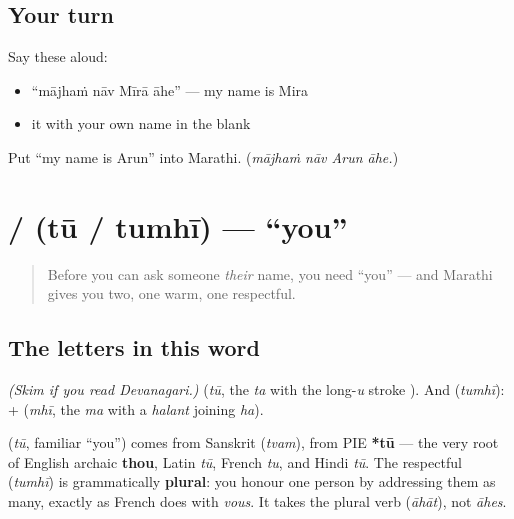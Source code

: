 \subsection*{Your turn}
Say these aloud:

\begin{itemize}
\raggedright
  \item \textquotedblleft{}mājhaṁ nāv Mīrā āhe\textquotedblright{} — my name is Mira
  \item it with your own name in the blank
\end{itemize}

\begin{tcolorbox}[breakable,colback=teal!4,colframe=teal!35!black,title={Before you move on}]
Put \textquotedblleft{}my name is Arun\textquotedblright{} into Marathi. (\emph{mājhaṁ nāv Arun āhe.})
\end{tcolorbox}
\section[\texorpdfstring{\mr{तू} / \mr{तुम्ही} (tū / tumhī)}{तू / तुम्ही (tū / tumhī)}]{ /  (tū / tumhī) — \textquotedblleft{}you\textquotedblright{}}

\label{lesson:MR-C02-tu-tumhi}



\begin{quote}
Before you can ask someone \emph{their} name, you need \textquotedblleft{}you\textquotedblright{} — and Marathi gives you two, one warm, one respectful.
\end{quote}

\subsection*{The letters in this word}
\emph{(Skim if you read Devanagari.)} \textbf{} (\emph{tū}, the  \emph{ta} with the long-\emph{u} stroke \textbf{}). And \textbf{} (\emph{tumhī}): \textbf{} + \textbf{} (\emph{mhī}, the  \emph{ma} with a \emph{halant} joining  \emph{ha}).

\begin{cousinweb}
\textbf{} (\emph{tū}, familiar \textquotedblleft{}you\textquotedblright{}) comes from Sanskrit \textbf{} (\emph{tvam}), from PIE \textbf{*tū} — the very root of English archaic \textbf{thou}, Latin \emph{tū}, French \emph{tu}, and Hindi \emph{tū}. The respectful \textbf{} (\emph{tumhī}) is grammatically \textbf{plural}: you honour one person by addressing them as many, exactly as French does with \emph{vous}. It takes the plural verb \textbf{} (\emph{āhāt}), not \emph{āhes}.
\end{cousinweb}


